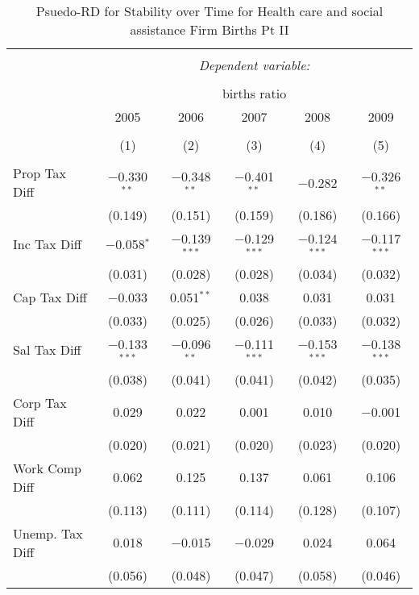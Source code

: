 
\begin{table}[!htbp] \centering 
  \caption{Psuedo-RD for Stability over Time for  Health care and social assistance Firm Births Pt II} 
  \label{62year} 
\small 
\begin{tabular}{@{\extracolsep{5pt}}lccccc} 
\\[-1.8ex]\hline 
\hline \\[-1.8ex] 
 & \multicolumn{5}{c}{\textit{Dependent variable:}} \\ 
\cline{2-6} 
\\[-1.8ex] & \multicolumn{5}{c}{births ratio} \\ 
 & 2005 & 2006 & 2007 & 2008 & 2009 \\ 
\\[-1.8ex] & (1) & (2) & (3) & (4) & (5)\\ 
\hline \\[-1.8ex] 
 Prop Tax Diff & $-$0.330$^{**}$ & $-$0.348$^{**}$ & $-$0.401$^{**}$ & $-$0.282 & $-$0.326$^{**}$ \\ 
  & (0.149) & (0.151) & (0.159) & (0.186) & (0.166) \\ 
  Inc Tax Diff & $-$0.058$^{*}$ & $-$0.139$^{***}$ & $-$0.129$^{***}$ & $-$0.124$^{***}$ & $-$0.117$^{***}$ \\ 
  & (0.031) & (0.028) & (0.028) & (0.034) & (0.032) \\ 
  Cap Tax Diff & $-$0.033 & 0.051$^{**}$ & 0.038 & 0.031 & 0.031 \\ 
  & (0.033) & (0.025) & (0.026) & (0.033) & (0.032) \\ 
  Sal Tax Diff & $-$0.133$^{***}$ & $-$0.096$^{**}$ & $-$0.111$^{***}$ & $-$0.153$^{***}$ & $-$0.138$^{***}$ \\ 
  & (0.038) & (0.041) & (0.041) & (0.042) & (0.035) \\ 
  Corp Tax Diff & 0.029 & 0.022 & 0.001 & 0.010 & $-$0.001 \\ 
  & (0.020) & (0.021) & (0.020) & (0.023) & (0.020) \\ 
  Work Comp Diff & 0.062 & 0.125 & 0.137 & 0.061 & 0.106 \\ 
  & (0.113) & (0.111) & (0.114) & (0.128) & (0.107) \\ 
  Unemp. Tax Diff & 0.018 & $-$0.015 & $-$0.029 & 0.024 & 0.064 \\ 
  & (0.056) & (0.048) & (0.047) & (0.058) & (0.046) \\ 

\end{tabular}
\end{table}
